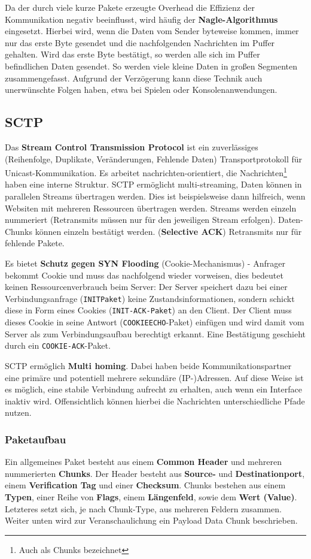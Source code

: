 \documentclass{article} %
\begin{document}
Da der durch viele kurze Pakete erzeugte Overhead die Effizienz der Kommunikation negativ beeinflusst, wird häufig der \textbf{Nagle-Algorithmus} eingesetzt.
Hierbei wird, wenn die Daten vom Sender byteweise kommen, immer nur das erste Byte gesendet und die nachfolgenden Nachrichten im Puffer gehalten.
Wird das erste Byte bestätigt, so werden alle sich im Puffer befindlichen Daten gesendet.
So werden viele kleine Daten in großen Segmenten zusammengefasst.
Aufgrund der Verzögerung kann diese Technik auch unerwünschte Folgen haben, etwa bei Spielen oder Konsolenanwendungen.


\subsection{SCTP}
Das \textbf{Stream Control Transmission Protocol}\cite{rfc4960} ist ein zuverlässiges (Reihenfolge, Duplikate, Veränderungen, Fehlende Daten) Transportprotokoll für Unicast-Kommunikation.
Es arbeitet nachrichten-orientiert, die Nachrichten\footnote{Auch als Chunks bezeichnet} haben eine interne Struktur.
SCTP ermöglicht multi-streaming, Daten können in parallelen Streams übertragen werden.
Dies ist beispielsweise dann hilfreich, wenn Websiten mit mehreren Ressourcen übertragen werden.
Streams werden einzeln nummeriert (Retransmits müssen nur für den jeweiligen Stream erfolgen).
Daten-Chunks können einzeln bestätigt werden. (\textbf{Selective ACK})
Retransmits nur für fehlende Pakete.

Es bietet \textbf{Schutz gegen SYN Flooding} (Cookie-Mechanismus) - Anfrager bekommt Cookie und muss das nachfolgend wieder vorweisen, dies bedeutet keinen Ressourcenverbrauch beim Server:
Der Server speichert dazu bei einer Verbindungsanfrage (\texttt{INITPaket}) keine Zustandsinformationen, sondern schickt diese in Form eines Cookies (\texttt{INIT-ACK-Paket}) an den Client.
Der Client muss dieses Cookie in seine Antwort (\texttt{COOKIEECHO}-Paket) einfügen und wird damit vom Server als zum Verbindungsaufbau berechtigt erkannt.
Eine Bestätigung geschieht durch ein \texttt{COOKIE-ACK}-Paket.

SCTP ermöglich \textbf{Multi homing}.
Dabei haben beide Kommunikationspartner eine primäre und potentiell mehrere sekundäre (IP-)Adressen.
Auf diese Weise ist es möglich, eine stabile Verbindung aufrecht zu erhalten, auch wenn ein Interface inaktiv wird.
Offensichtlich können hierbei die Nachrichten unterschiedliche Pfade nutzen.
\subsubsection{Paketaufbau}
Ein allgemeines Paket besteht aus einem \textbf{Common Header} und mehreren nummerierten \textbf{Chunks}.
Der Header besteht aus \textbf{Source-} und \textbf{Destinationport}, einem \textbf{Verification Tag} und einer \textbf{Checksum}.
Chunks bestehen aus einem \textbf{Typen}, einer Reihe von \textbf{Flags}, einem \textbf{Längenfeld}, sowie dem \textbf{Wert (Value)}.
Letzteres setzt sich, je nach Chunk-Type, aus mehreren Feldern zusammen.
Weiter unten wird zur Veranschaulichung ein Payload Data Chunk beschrieben.
\end{document}
